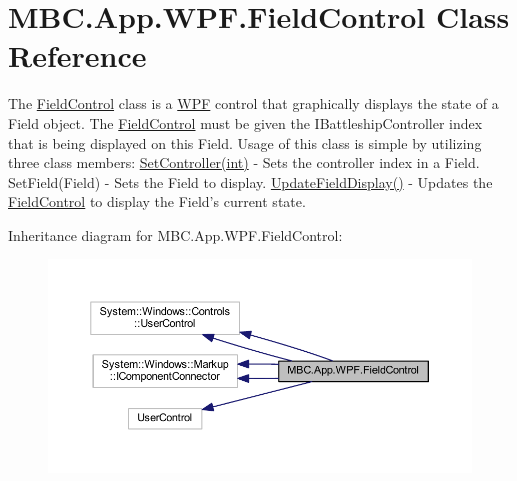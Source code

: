 \hypertarget{class_m_b_c_1_1_app_1_1_w_p_f_1_1_field_control}{\section{M\-B\-C.\-App.\-W\-P\-F.\-Field\-Control Class Reference}
\label{class_m_b_c_1_1_app_1_1_w_p_f_1_1_field_control}
}


The \hyperlink{class_m_b_c_1_1_app_1_1_w_p_f_1_1_field_control}{Field\-Control} class is a \hyperlink{namespace_m_b_c_1_1_app_1_1_w_p_f}{W\-P\-F} control that graphically displays the state of a Field object. The \hyperlink{class_m_b_c_1_1_app_1_1_w_p_f_1_1_field_control}{Field\-Control} must be given the I\-Battleship\-Controller index that is being displayed on this Field. Usage of this class is simple by utilizing three class members\-: \hyperlink{class_m_b_c_1_1_app_1_1_w_p_f_1_1_field_control_abdf9f4f572eb3f9f84caee3b0a9729a1}{Set\-Controller(int)} -\/ Sets the controller index in a Field. Set\-Field(\-Field) -\/ Sets the Field to display. \hyperlink{class_m_b_c_1_1_app_1_1_w_p_f_1_1_field_control_a5f73d69fb63c3fa2e03b145d66f914b6}{Update\-Field\-Display()} -\/ Updates the \hyperlink{class_m_b_c_1_1_app_1_1_w_p_f_1_1_field_control}{Field\-Control} to display the Field's current state.  




Inheritance diagram for M\-B\-C.\-App.\-W\-P\-F.\-Field\-Control\-:
\nopagebreak
\begin{figure}[H]
\begin{center}
\leavevmode
\includegraphics[width=350pt]{class_m_b_c_1_1_app_1_1_w_p_f_1_1_field_control__inherit__graph}
\end{center}
\end{figure}


